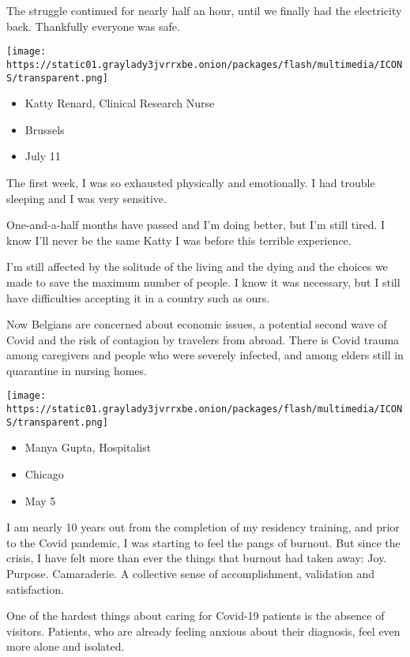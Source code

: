 The struggle continued for nearly half an hour, until we finally had the
electricity back. Thankfully everyone was safe.

\texttt{[image: https://static01.graylady3jvrrxbe.onion/packages/flash/multimedia/ICONS/transparent.png]}

\begin{itemize}
\tightlist
\item
  Katty Renard, Clinical Research Nurse
\item
  Brussels
\item
  July 11
\end{itemize}

The first week, I was so exhausted physically and emotionally. I had
trouble sleeping and I was very sensitive.

One-and-a-half months have passed and I'm doing better, but I'm still
tired. I know I'll never be the same Katty I was before this terrible
experience.

I'm still affected by the solitude of the living and the dying and the
choices we made to save the maximum number of people. I know it was
necessary, but I still have difficulties accepting it in a country such
as ours.

Now Belgians are concerned about economic issues, a potential second
wave of Covid and the risk of contagion by travelers from abroad. There
is Covid trauma among caregivers and people who were severely infected,
and among elders still in quarantine in nursing homes.

\texttt{[image: https://static01.graylady3jvrrxbe.onion/packages/flash/multimedia/ICONS/transparent.png]}

\begin{itemize}
\tightlist
\item
  Manya Gupta, Hospitalist
\item
  Chicago
\item
  May 5
\end{itemize}

I am nearly 10 years out from the completion of my residency training,
and prior to the Covid pandemic, I was starting to feel the pangs of
burnout. But since the crisis, I have felt more than ever the things
that burnout had taken away: Joy. Purpose. Camaraderie. A collective
sense of accomplishment, validation and satisfaction.

One of the hardest things about caring for Covid-19 patients is the
absence of visitors. Patients, who are already feeling anxious about
their diagnosis, feel even more alone and isolated.

